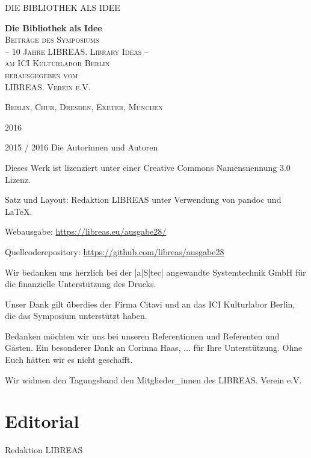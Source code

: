 \documentclass[10.5pt,a5paper,twoside]{memoir}
\makeatletter
\DeclareRobustCommand\authortoctext[1]{%
{\addvspace{20pt}\nopagebreak\leftskip0em\relax
\rightskip \@tocrmarg\relax
\noindent\itshape#1\par\addvspace{-7pt}}}
\newcommand\authortoc[1]{%
  \gdef\chapterauthor{#1}%
  \addtocontents{toc}{\authortoctext{#1}}}
\newlength\drop
\newcommand*\titleM{\begingroup%
\setlength\drop{0.08\textheight}
\centering
\vspace*{\drop}
{\Huge\bfseries Die Bibliothek als Idee}\\[\baselineskip]
{\scshape Beiträge des Symposiums \\ -- 10 Jahre LIBREAS. Library Ideas -- \\ am ICI Kulturlabor Berlin}\\[\baselineskip]
\vfill
{\large\scshape {\small herausgegeben vom}\\{\large LIBREAS. Verein e.V.}}\par
\vfill
{\scshape Berlin, Chur, Dresden, Exeter, München}\par
\vfill
{\scshape 2016}\par
\endgroup}
\makeatother
\begin{document}
\frontmatter

\pagestyle{empty}
\begin{flushright}
{\LARGE DIE BIBLIOTHEK ALS IDEE} 
\end{flushright}

\cleartorecto

\pagestyle{empty}
\titleM
\cleartoverso


\begingroup
\footnotesize
\parindent 0pt
\parskip \baselineskip
\vspace*{\fill}
\textcopyright{} 2015 / 2016 Die Autorinnen und Autoren

Dieses Werk ist lizenziert unter einer Creative Commons Namensnennung 3.0 Lizenz.

Satz und Layout: Redaktion LIBREAS unter Verwendung von pandoc und \LaTeX\xspace. 

Webausgabe: \url{https://libreas.eu/ausgabe28/}

Quellcoderepository: \url{https://github.com/libreas/ausgabe28}

    \endgroup
\newpage

\begin{flushright}
Wir bedanken uns herzlich bei der |a|S|tec| angewandte Systemtechnik GmbH für die finanzielle Unterstützung des Drucks. 

\vspace{10mm}

Unser Dank gilt überdies der Firma Citavi und an das ICI Kulturlabor Berlin, die das Symposium unterstützt haben.

\vspace{10mm}

Bedanken möchten wir uns bei unseren Referentinnen und Referenten und Gästen. Ein besonderer Dank an Corinna Haas, ... für Ihre Unterstützung. Ohne Euch hätten wir es nicht geschafft.

\vspace{10mm}

Wir widmen den Tagungsband den Mitglieder\_innen des LIBREAS. Verein e.V.
\end{flushright}

\cleartorecto

\tableofcontents*

\mainmatter
\pagestyle{mystyle}


\authortoc{Redaktion LIBREAS}
\chapter*[Editorial]{Editorial}
\begin{flushright}
{\large Redaktion LIBREAS}
\end{flushright}
\end{document}
